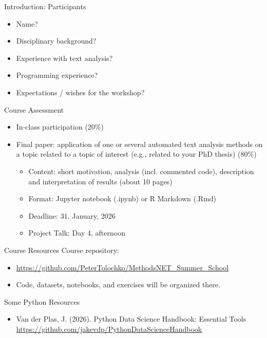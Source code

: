 \documentclass[11pt,aspectratio=43]{beamer}
\begin{document}
\begin{frame}{Introduction: Participants}
\begin{itemize}
\item Name?
\item Disciplinary background?
\item Experience with text analysis?
\item Programming experience?
\item Expectations / wishes for the workshop?
\end{itemize}
\end{frame}

\begin{frame}{Course Assessment}
\begin{itemize}
\item In-class participation (20\%)\\
\item Final paper: application of one or several automated text analysis methods on a topic related to a topic of interest (e.g., related to your PhD thesis) (80\%)
\begin{itemize}
\item Content: short motivation, analysis (incl. commented code), description and interpretation of results (about 10 pages)
\item Format: Jupyter notebook (.ipynb) or R Markdown (.Rmd)
\item Deadline: 31. January, 2026
\item Project Talk: Day 4, afternoon
\end{itemize}
\end{itemize}
\end{frame}

\begin{frame}{Course Resources}
Course repository:
\begin{itemize}
\item \url{https://github.com/PeterTolochko/MethodsNET_Summer_School}
\item Code, datasets, notebooks, and exercises will be organized there.
\end{itemize}
\end{frame}

\begin{frame}{Some Python Resources}
\begin{itemize}
\item Van der Plas, J. (2026). Python Data Science Handbook: Essential Tools \url{https://github.com/jakevdp/PythonDataScienceHandbook}
\end{itemize}
\end{frame}
\end{document}
